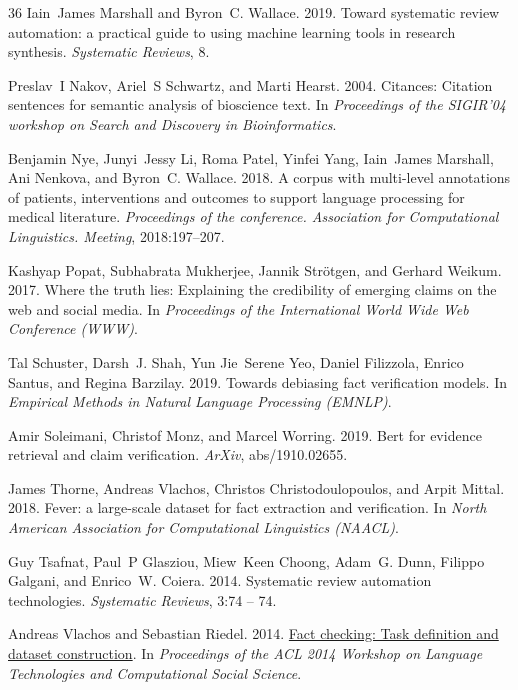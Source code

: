 \documentclass[11pt,a4paper]{article}
\begin{document}
\begin{thebibliography}{36}
Iain~James Marshall and Byron~C. Wallace. 2019.
\newblock Toward systematic review automation: a practical guide to using
  machine learning tools in research synthesis.
\newblock \emph{Systematic Reviews}, 8.

Preslav~I Nakov, Ariel~S Schwartz, and Marti Hearst. 2004.
\newblock Citances: Citation sentences for semantic analysis of bioscience
  text.
\newblock In \emph{Proceedings of the SIGIR’04 workshop on Search and
  Discovery in Bioinformatics}.

Benjamin Nye, Junyi~Jessy Li, Roma Patel, Yinfei Yang, Iain~James Marshall, Ani
  Nenkova, and Byron~C. Wallace. 2018.
\newblock A corpus with multi-level annotations of patients, interventions and
  outcomes to support language processing for medical literature.
\newblock \emph{Proceedings of the conference. Association for Computational
  Linguistics. Meeting}, 2018:197--207.

Kashyap Popat, Subhabrata Mukherjee, Jannik Str{\"o}tgen, and Gerhard Weikum.
  2017.
\newblock Where the truth lies: Explaining the credibility of emerging claims
  on the web and social media.
\newblock In \emph{Proceedings of the International World Wide Web Conference
  (WWW)}.

Tal Schuster, Darsh~J. Shah, Yun Jie~Serene Yeo, Daniel Filizzola, Enrico
  Santus, and Regina Barzilay. 2019.
\newblock Towards debiasing fact verification models.
\newblock In \emph{Empirical Methods in Natural Language Processing (EMNLP)}.

Amir Soleimani, Christof Monz, and Marcel Worring. 2019.
\newblock Bert for evidence retrieval and claim verification.
\newblock \emph{ArXiv}, abs/1910.02655.

James Thorne, Andreas Vlachos, Christos Christodoulopoulos, and Arpit Mittal.
  2018.
\newblock Fever: a large-scale dataset for fact extraction and verification.
\newblock In \emph{North American Association for Computational Linguistics
  (NAACL)}.

Guy Tsafnat, Paul~P Glasziou, Miew~Keen Choong, Adam~G. Dunn, Filippo Galgani,
  and Enrico~W. Coiera. 2014.
\newblock Systematic review automation technologies.
\newblock \emph{Systematic Reviews}, 3:74 -- 74.

Andreas Vlachos and Sebastian Riedel. 2014.
\newblock \href {https://doi.org/10.3115/v1/W14-2508} {Fact checking: Task
  definition and dataset construction}.
\newblock In \emph{Proceedings of the {ACL} 2014 Workshop on Language
  Technologies and Computational Social Science}.


\end{thebibliography}
\end{document}
